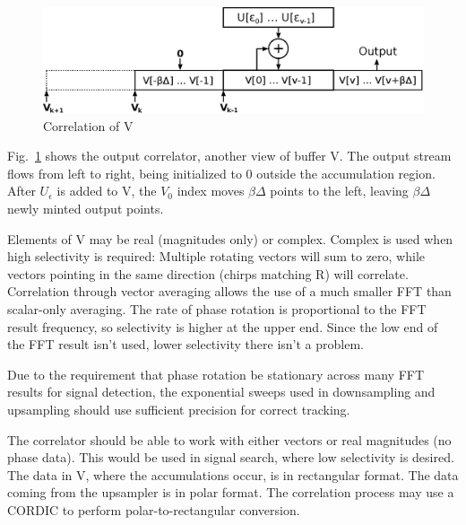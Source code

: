 \begin{figure}
	\centering
	\includegraphics[width=0.99\linewidth]{../source/wbuf_e}
	\caption[W correlation]{Correlation of V}
	\label{fig:wbuf}
\end{figure}

Fig.~\ref{fig:wbuf} shows the output correlator, another view of buffer V.
The output stream flows from left to right,
being initialized to 0 outside the accumulation region.
After $U_\epsilon$ is added to V, the $V_0$ index moves $\beta\Delta$ points
to the left, leaving $\beta\Delta$ newly minted output points.

Elements of V may be real (magnitudes only) or complex.
Complex is used when high selectivity is required:
Multiple rotating vectors will sum to zero, while vectors pointing in the same
direction (chirps matching R) will correlate.
Correlation through vector averaging allows the use of a much smaller FFT than
scalar-only averaging.
The rate of phase rotation is proportional to the FFT result frequency,
so selectivity is higher at the upper end.
Since the low end of the FFT result isn't used,
lower selectivity there isn't a problem.

Due to the requirement that phase rotation be stationary across many FFT results
for signal detection, the exponential sweeps used in downsampling and upsampling
should use sufficient precision for correct tracking.

The correlator should be able to work with either vectors or real magnitudes
(no phase data).
This would be used in signal search, where low selectivity is desired.
The data in V, where the accumulations occur, is in rectangular format.
The data coming from the upsampler is in polar format.
The correlation process may use a CORDIC to perform polar-to-rectangular
conversion.
